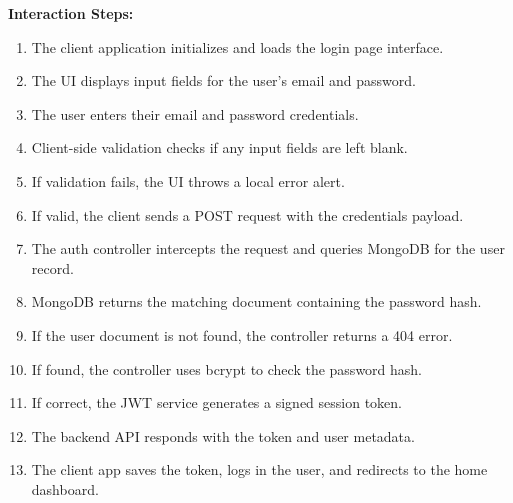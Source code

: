 \documentclass[12pt,a4paper]{report}
\begin{document}
  \textbf{Interaction Steps:}
  \begin{enumerate}
      \item The client application initializes and loads the login page interface.
      \item The UI displays input fields for the user's email and password.
      \item The user enters their email and password credentials.
      \item Client-side validation checks if any input fields are left blank.
      \item If validation fails, the UI throws a local error alert.
      \item If valid, the client sends a POST request with the credentials payload.
      \item The auth controller intercepts the request and queries MongoDB for the user record.
      \item MongoDB returns the matching document containing the password hash.
      \item If the user document is not found, the controller returns a 404 error.
      \item If found, the controller uses bcrypt to check the password hash.
      \item If correct, the JWT service generates a signed session token.
      \item The backend API responds with the token and user metadata.
      \item The client app saves the token, logs in the user, and redirects to the home dashboard.
  \end{enumerate}
  
\end{document}
